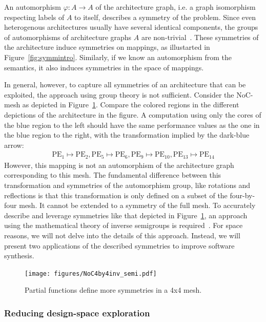 \documentclass[sigplan,10pt]{acmart}
\begin{document}
An automorphism $\varphi: A \rightarrow A$ of the architecture graph, i.e. a graph isomorphism respecting labels of $A$ to itself, describes a symmetry of the problem.
Since even heterogenous architectures usually have several identical components, the groups of automorphisms of architecture graphs $A$ are non-trivial~\cite{goens_iess15}.
These symmetries of the architecture induce symmetries on mappings, as illustarted in Figure~\ref{fig:symmintro}.
Similarly, if we know an automorphism from the semantics, it also induces symmetries in the space of mappings. 

In general, however, to capture all symmetries of an architecture that can be exploited, the approach using group theory is not sufficient. 
Consider the NoC-mesh as depicted in Figure~\ref{fig:4x4NoC_inv_semi}.
Compare the colored regions in the different depictions of the architecture in the figure.
A computation using only the cores of the blue region to the left should have the same performance values as the one in the blue region to the right, with the transformation implied by the dark-blue arrow:
\begin{align}
\label{eq:partial_4by4}\text{PE}_1 \mapsto \text{PE}_{2}, \text{PE}_{5} \mapsto \text{PE}_{6}, \text{PE}_9 \mapsto \text{PE}_{10}, \text{PE}_{13} \mapsto \text{PE}_{14}
\end{align}
However, this mapping is not an automorphism of the architecture graph corresponding to this mesh.
The fundamental difference between this transformation and symmetries of the automorphism group, like rotations and reflections is that this transformation is only defined on a subset of the four-by-four mesh.
It cannot be extended to a symmetry of the full mesh.
To accurately describe and leverage symmetries like that depicted in Figure~\ref{fig:4x4NoC_inv_semi}, an approach using the mathematical theory of inverse semigroups is required~\cite{goens_taco17}.
For space reasons, we will not delve into the details of this approach.
Instead, we will present two applications of the described symmetries to improve software synthesis.

\begin{figure}[h]
	\centering
	\texttt{[image: figures/NoC4by4inv\_semi.pdf]}
	\caption{Partial functions define more symmetries in a 4x4 mesh.}
	\label{fig:4x4NoC_inv_semi}
\end{figure}



\subsubsection{Reducing design-space exploration}
\end{document}
